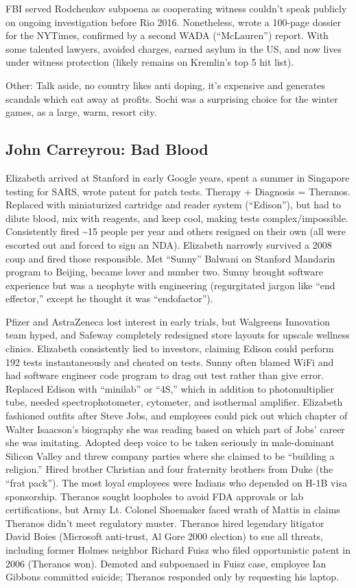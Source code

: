 \documentclass[
]{article}
\begin{document}
FBI served Rodchenkov subpoena as cooperating witness couldn't speak
publicly on ongoing investigation before Rio 2016. Nonetheless, wrote a
100-page dossier for the NYTimes, confirmed by a second WADA
(``McLauren'') report. With some talented lawyers, avoided charges,
earned asylum in the US, and now lives under witness protection (likely
remains on Kremlin's top 5 hit list).

Other: Talk aside, no country likes anti doping, it's expensive and
generates scandals which eat away at profits. Sochi was a surprising
choice for the winter games, as a large, warm, resort city.

\hypertarget{john-carreyrou-bad-blood}{%
\subsection{John Carreyrou: Bad Blood}\label{john-carreyrou-bad-blood}}

Elizabeth arrived at Stanford in early Google years, spent a summer in
Singapore testing for SARS, wrote patent for patch tests. Therapy +
Diagnosis = Theranos. Replaced with miniaturized cartridge and reader
system (``Edison''), but had to dilute blood, mix with reagents, and
keep cool, making tests complex/impossible. Consistently fired
\textasciitilde15 people per year and others resigned on their own (all
were escorted out and forced to sign an NDA). Elizabeth narrowly
survived a 2008 coup and fired those responsible. Met ``Sunny'' Balwani
on Stanford Mandarin program to Beijing, became lover and number two.
Sunny brought software experience but was a neophyte with engineering
(regurgitated jargon like ``end effector,'' except he thought it was
``endofactor'').

Pfizer and AstraZeneca lost interest in early trials, but Walgreens
Innovation team hyped, and Safeway completely redesigned store layouts
for upscale wellness clinics. Elizabeth consistently lied to investors,
claiming Edison could perform 192 tests instantaneously and cheated on
tests. Sunny often blamed WiFi and had software engineer code program to
drag out test rather than give error. Replaced Edison with ``minilab''
or ``4S,'' which in addition to photomultiplier tube, needed
spectrophotometer, cytometer, and isothermal amplifier. Elizabeth
fashioned outfits after Steve Jobs, and employees could pick out which
chapter of Walter Isaacson's biography she was reading based on which
part of Jobs' career she was imitating. Adopted deep voice to be taken
seriously in male-dominant Silicon Valley and threw company parties
where she claimed to be ``building a religion.'' Hired brother Christian
and four fraternity brothers from Duke (the ``frat pack''). The most
loyal employees were Indians who depended on H-1B visa sponsorship.
Theranos sought loopholes to avoid FDA approvals or lab certifications,
but Army Lt. Colonel Shoemaker faced wrath of Mattis in claims Theranos
didn't meet regulatory muster. Theranos hired legendary litigator David
Boies (Microsoft anti-trust, Al Gore 2000 election) to sue all threats,
including former Holmes neighbor Richard Fuisz who filed opportunistic
patent in 2006 (Theranos won). Demoted and subpoenaed in Fuisz case,
employee Ian Gibbons committed suicide; Theranos responded only by
requesting his laptop.
\end{document}
